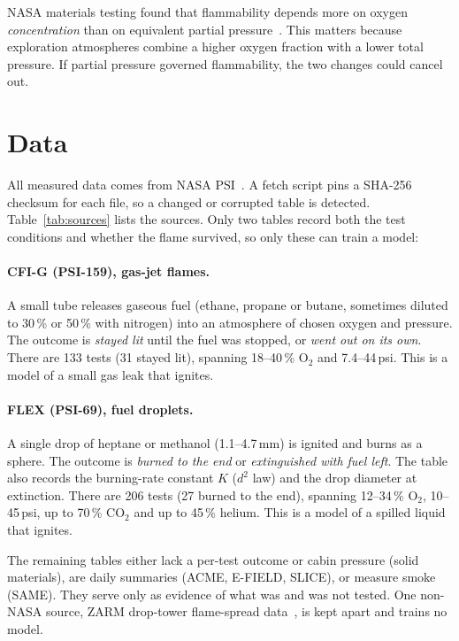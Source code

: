 \documentclass[11pt,twocolumn]{article}
\newcommand{\Otwo}{\ensuremath{\mathrm{O_2}}}
\newcommand{\COtwo}{\ensuremath{\mathrm{CO_2}}}
\newcommand{\pct}{\,\%}
\begin{document}
NASA materials testing found that flammability depends more on oxygen \emph{concentration} than on
equivalent partial pressure~\cite{harper2016}. This matters because exploration atmospheres combine a higher
oxygen fraction with a lower total pressure. If partial pressure governed flammability, the two changes
could cancel out.

\section{Data}
\label{sec:data}

All measured data comes from NASA PSI~\cite{psi}. A fetch script pins a SHA-256 checksum for each file, so a
changed or corrupted table is detected. Table~\ref{tab:sources} lists the sources. Only two tables record
both the test conditions and whether the flame survived, so only these can train a model:

\paragraph{CFI-G (PSI-159), gas-jet flames.} A small tube releases gaseous fuel (ethane, propane or
butane, sometimes diluted to 30\pct{} or 50\pct{} with nitrogen) into an atmosphere of chosen oxygen and
pressure. The outcome is \emph{stayed lit} until the fuel was stopped, or \emph{went out on its own}. There
are 133 tests (31 stayed lit), spanning 18--40\pct{} \Otwo{} and 7.4--44\,psi. This is a model of a small gas
leak that ignites.

\paragraph{FLEX (PSI-69), fuel droplets.} A single drop of heptane or methanol (1.1--4.7\,mm) is ignited
and burns as a sphere. The outcome is \emph{burned to the end} or \emph{extinguished with fuel left}. The
table also records the burning-rate constant $K$ ($d^2$ law) and the drop diameter at extinction. There are
206 tests (27 burned to the end), spanning 12--34\pct{} \Otwo, 10--45\,psi, up to 70\pct{} \COtwo{} and up to
45\pct{} helium. This is a model of a spilled liquid that ignites.

The remaining tables either lack a per-test outcome or cabin pressure (solid materials), are daily
summaries (ACME, E-FIELD, SLICE), or measure smoke (SAME). They serve only as evidence of what was and was
not tested. One non-NASA source, ZARM drop-tower flame-spread data~\cite{zarm}, is kept apart and trains no
model.
\end{document}
